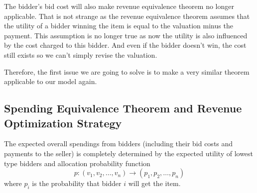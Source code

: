%

The bidder's bid cost will also make revenue equivalence theorem no longer
applicable.  That is not strange as the revenue equivalence theorem assumes
that the utility of a bidder winning the item is equal to the valuation minus
the payment. This assumption is no longer true as now the utility is also
influenced by the cost charged to this bidder. And even if the bidder doesn't
win, the cost still exists so we can't simply revise the valuation.

Therefore, the first issue we are going to solve is to make a very similar
theorem applicable to our model again. 

\subsection{Spending Equivalence Theorem and Revenue Optimization Strategy}

\begin{theorem}\label{theorem:equivalence}

The expected overall spendings from bidders (including their bid costs and
payments to the seller) is completely determined by the expected utility of
lowest type bidders and allocation probability function
$$p: (v_1, v_2, \ldots, v_n) \rightarrow (p_1, p_2, \ldots, p_n)$$ 
where $p_i$ is the probability that bidder $i$ will get the item.

\end{theorem}

